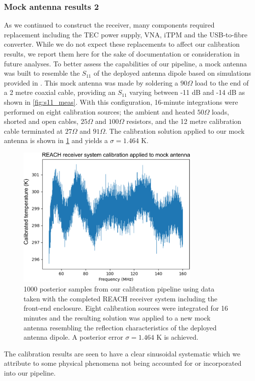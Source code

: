 \subsubsection{Mock antenna results 2}
As we continued to construct the receiver, many components required replacement including the TEC power supply, VNA, iTPM and the USB-to-fibre converter. While we do not expect these replacements to affect our calibration results, we report them here for the sake of documentation or consideration in future analyses. To better assess the capabilities of our pipeline, a mock antenna was built to resemble the $S_{11}$ of the deployed antenna dipole based on simulations provided in \citet{john_antenna}. This mock antenna was made by soldering a $90 \Omega$ load to the end of a 2 metre coaxial cable, providing an $S_{11}$ varying between -11 dB and -14 dB as shown in \cref{fig:s11_meas}. With this configuration, 16-minute integrations were performed on eight calibration sources; the ambient and heated $50 \Omega$ loads, shorted and open cables, $25 \Omega$ and $100 \Omega$ resistors, and the 12 metre calibration cable terminated at $27 \Omega$ and $91 \Omega$. The calibration solution applied to our mock antenna is shown in \cref{fig:reach_results_2} and yields a $\sigma = 1.464$ K.
\begin{figure}
    \centering
    \includegraphics[width=0.8\textwidth]{reach_results_2}
    \caption{1000 posterior samples from our calibration pipeline using data taken with the completed REACH receiver system including the front-end enclosure. Eight calibration sources were integrated for 16 minutes and the resulting solution was applied to a new mock antenna resembling the reflection characteristics of the deployed antenna dipole. A posterior error $\sigma = 1.464$ K is achieved.}
    \label{fig:reach_results_2}
\end{figure}
The calibration results are seen to have a clear sinusoidal systematic which we attribute to some physical phenomena not being accounted for or incorporated into our pipeline.

